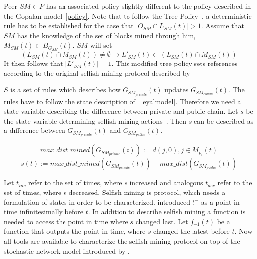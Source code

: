 Peer $SM \in P$ has an associated policy slightly different to the policy described in the Gopalan model~\ref{policy}. Note that to follow the Tree Policy~\citep{gopalan}, a deterministic rule has to be established for the case that $|O_{SM} \cap L_{SM}(t)| > 1$.
Assume that $SM$ has the knowledge of the set of blocks mined through him, $M_{SM}(t) \subset B_{G_{SM}}(t)$. $SM$ will set 
\begin{equation}
(L_{SM}(t) \cap M_{SM}(t)) \neq \emptyset \rightarrow L'_{SM}(t) \subset ( L_{SM}(t) \cap M_{SM}(t)) 
\label{smpolicy}
\end{equation}
It then follows that $|L'_{SM}(t)|=1$.
This modified tree policy sets references according to the original selfish mining protocol described by \citeauthor{eyal}.

$S$ is a set of rules which describes how $G_{SM_{private}}(t)$ updates $G_{SM_{comm}}(t)$. The rules have to follow the state description of \citeauthor{eyal}~\ref{eyalmodel}. Therefore we need a state variable describing the difference between private and public chain.
Let $s$ be the state variable determining selfish mining actions~\citep{eyal}.
Then $s$ can be described as a difference between $G_{SM_{private}}(t)$ and $G_{SM_{public}}(t)$.

\begin{equation}
max\_ dist\_mined(G_{SM_{private}}(t)) := d(j,0), j \in M_{p_i}(t)
\end{equation}
\begin{equation}
s(t) := max\_ dist\_mined(G_{SM_{private}}(t)) - max\_ dist(G_{SM_{public}}(t))
\end{equation}

Let $t_{inc}$ refer to the set of times, where $s$ increased and analogous $t_{dec}$ refer to the set of times, where $s$ decreased.
Selfish mining is protocol, which needs a formulation of states in order to be characterized. \citeauthor{gopalan} introduced $t^-$ as a point in time infinitesimally before $t$. In addition to describe selfish mining a function is needed to access the point in time where $s$ changed last.
Let $f_{-1}(t)$ be a function that outputs the point in time, where $s$ changed the latest before $t$.
Now all tools are available to characterize the selfish mining protocol on top of the stochastic network model introduced by \citeauthor{gopalan}.

